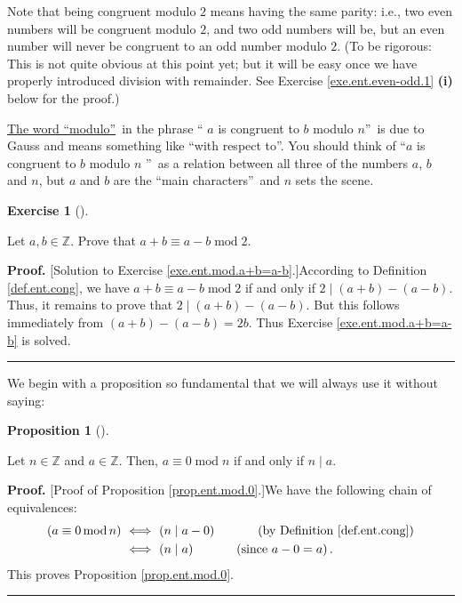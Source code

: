 \documentclass[numbers=enddot,12pt,final,onecolumn,notitlepage]{scrartcl}%
\newcounter{exer}
\numberwithin{exer}{subsection}
\theoremstyle{definition}
\newtheorem{prop}[theo]{Proposition}
\newenvironment{proposition}[1][]
{\begin{prop}[#1]\begin{leftbar}}
{\end{leftbar}\end{prop}}
\newtheorem{exmp}[exer]{Exercise}
\newenvironment{exercise}[1][]
{\begin{exmp}[#1]\begin{leftbar}}
{\end{leftbar}\end{exmp}}
\newenvironment{fineprint}{\begin{small}}{\end{small}}
\newenvironment{proof}[1][Proof]{\noindent\textbf{#1.} }{\ \rule{0.5em}{0.5em}}
\begin{document}
Note that being congruent modulo $2$ means having the same parity: i.e., two
even numbers will be congruent modulo $2$, and two odd numbers will be, but an
even number will never be congruent to an odd number modulo $2$. (To be
rigorous: This is not quite obvious at this point yet; but it will be easy
once we have properly introduced division with remainder. See Exercise
\ref{exe.ent.even-odd.1} \textbf{(i)} below for the proof.)

\href{https://en.wikipedia.org/wiki/Modulo_(jargon)}{The word
\textquotedblleft modulo\textquotedblright}\ in the phrase \textquotedblleft%
$a$ is congruent to $b$ modulo $n$\textquotedblright\ is due to Gauss and
means something like \textquotedblleft with respect to\textquotedblright. You
should think of \textquotedblleft$a$ is congruent to $b$ modulo $n$%
\textquotedblright\ as a relation between all three of the numbers $a$, $b$
and $n$, but $a$ and $b$ are the \textquotedblleft main
characters\textquotedblright\ and $n$ sets the scene.

\begin{exercise}
\label{exe.ent.mod.a+b=a-b}Let $a,b\in\mathbb{Z}$. Prove that $a+b\equiv
a-b\operatorname{mod}2$.
\end{exercise}

\begin{fineprint}
\begin{proof}
[Solution to Exercise \ref{exe.ent.mod.a+b=a-b}.]According to Definition
\ref{def.ent.cong}, we have $a+b\equiv a-b\operatorname{mod}2$ if and only if
$2\mid\left(  a+b\right)  -\left(  a-b\right)  $. Thus, it remains to prove
that $2\mid\left(  a+b\right)  -\left(  a-b\right)  $. But this follows
immediately from $\left(  a+b\right)  -\left(  a-b\right)  =2b$. Thus Exercise
\ref{exe.ent.mod.a+b=a-b} is solved.
\end{proof}
\end{fineprint}

We begin with a proposition so fundamental that we will always use it without saying:

\begin{proposition}
\label{prop.ent.mod.0}Let $n\in\mathbb{Z}$ and $a\in\mathbb{Z}$. Then,
$a\equiv0\operatorname{mod}n$ if and only if $n\mid a$.
\end{proposition}

\begin{proof}
[Proof of Proposition \ref{prop.ent.mod.0}.]We have the following chain of
equivalences:%
\begin{align*}
\left(  a\equiv0\operatorname{mod}n\right)  \  &  \Longleftrightarrow\ \left(
n\mid a-0\right)  \ \ \ \ \ \ \ \ \ \ \left(  \text{by Definition
\ref{def.ent.cong}}\right) \\
&  \Longleftrightarrow\ \left(  n\mid a\right)  \ \ \ \ \ \ \ \ \ \ \left(
\text{since }a-0=a\right)  .
\end{align*}
This proves Proposition \ref{prop.ent.mod.0}.
\end{proof}
\end{document}

